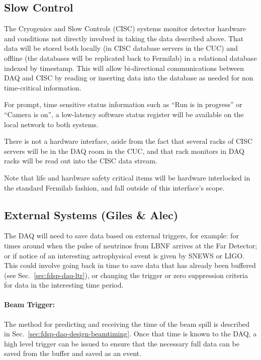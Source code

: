 \subsection{Slow Control}
\label{sec:fdsp-daq-intfc-ext}

The Cryogenics and Slow Controls (CISC) systems monitor detector
hardware and conditions not directly involved in taking the data
described above.  That data will be stored both locally (in CISC
database servers in the CUC) and offline (the databases will be
replicated back to Fermilab) in a relational database indexed by
timestamp.  This will allow bi-directional communications between DAQ
and CISC by reading or inserting data into the database as needed for
non time-critical information.  

For prompt, time sensitive status information such as ``Run is in
progress'' or ``Camera is on'', a low-latency software status register
will be available on the local network to both systems.

There is not a hardware interface, aside from the fact that several
racks of CISC servers will be in the DAQ room in the CUC, and that rack
monitors in DAQ racks will be read out into the CISC data stream.

Note that life and hardware safety critical items will be hardware
interlocked in the standard Fermilab fashion, and fall outside of this
interface's scope.


\subsection{External Systems (Giles \& Alec)}
\label{sec:fdsp-daq-intfc-ext}


The DAQ will need to save data based on external triggers, for example:
for times around when the pulse of neutrinos from LBNF arrives at the
Far Detector; or if notice of an interesting astrophysical event is
given by SNEWS\cite{snews} or LIGO.  This could involve going back in
time to save data that has already been buffered (see
Sec.~\ref{sec:fdsp-daq-ltr}), or changing the trigger or zero
suppression criteria for data in the interesting time period.

\paragraph{Beam Trigger:} The method for predicting and receiving the
time of the beam spill is described in
Sec.~\ref{sec:fdsp-daq-design-beamtiming}.  Once that time is known to
the DAQ, a high level trigger can be issued to ensure that the necessary
full data can be saved from the buffer and saved as an event.

